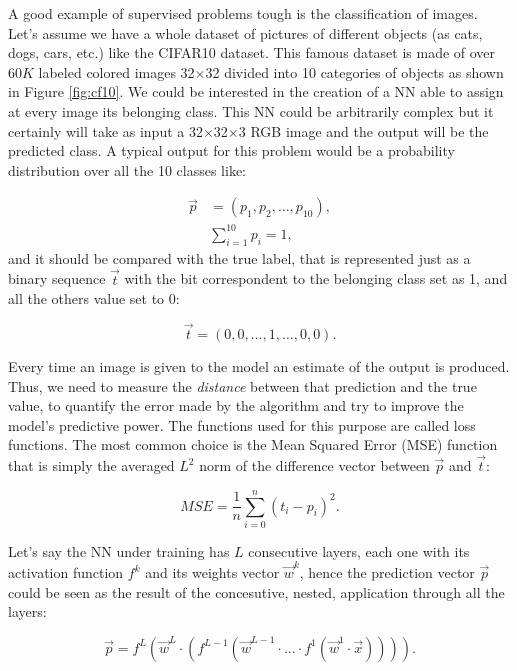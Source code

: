 A good example of supervised problems tough is the classification of images. Let's assume we have a whole dataset of pictures of different objects (as cats, dogs, cars, etc.) like the CIFAR10 \cite{cifar10} dataset. This famous dataset is made of over 60$K$ labeled colored images 32$\times$32 divided into 10 categories of objects as shown in Figure \ref{fig:cf10}. We could be interested in the creation of a NN able to assign at every image its belonging class. This NN could be arbitrarily complex but it certainly will take as input a 32$\times$32$\times$3 RGB image and the output will be the predicted class. A typical output for this problem would be a probability distribution over all the 10 classes like:

\begin{align}
    \vec p & = (p_1, p_2, \dots, p_{10}), \\
    &\sum_{i=1}^{10} p_i = 1,
\end{align}
and it should be compared with the true label, that is represented just as a binary sequence $\vec t$ with the bit correspondent to the belonging class set as 1, and all the others value set to 0:

\begin{equation}
    \vec t = (0,0,\dots, 1, \dots,0,0).
\end{equation}

Every time an image is given to the model an estimate of the output is produced. Thus, we need to measure the \textit{distance} between that prediction and the true value, to quantify the error made by the algorithm and try to improve the model's predictive power. The functions used for this purpose are called loss functions. The most common choice is the Mean Squared Error (MSE) function that is simply the averaged $L^2$ norm of the difference vector between $\vec p$ and $\vec t$:

\begin{equation}
    MSE = \frac{1}{n} \sum_{i=0}^{n} (t_i - p_i)^2.
    \label{eq:MSE}
\end{equation}

Let's say the NN under training has $L$ consecutive layers, each one with its activation function $f^k$ and its weights vector $\vec w^k$, hence the prediction vector $\vec p$ could be seen as the result of the concesutive, nested, application through all the layers:

\begin{equation}
    \vec p = f^L(\vec w^L \cdot (f^{L-1}(\vec w^{L-1} \cdot ... \cdot f^1(\vec w^1 \cdot \vec x)))).
    \label{eq:neste_layers}
\end{equation}

